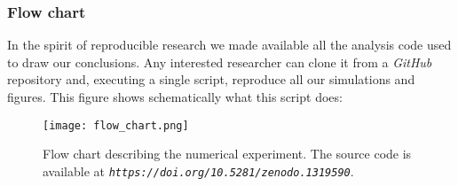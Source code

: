 \subsubsection{Flow chart}
\label{subsubsec:FlowChart}
In the spirit of reproducible research we made available all the analysis code used to draw our conclusions. Any interested researcher can clone it from a \textit{GitHub} repository \citep{Rodriguez-Sanchez-code-neuchaos} and, executing a single script, reproduce all our simulations and figures. This figure shows schematically what this script does:

\begin{figure}[H]
	\begin{center}
		\texttt{[image: flow\_chart.png]}
	\end{center}
	\caption{Flow chart describing the numerical experiment. The source code is available at \textit{\texttt{https://doi.org/10.5281/zenodo.1319590}}.}
	\label{fig:FlowChart}
\end{figure}
